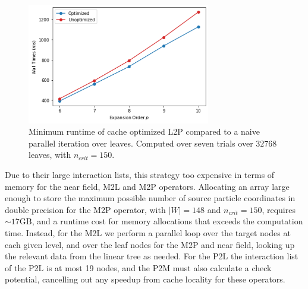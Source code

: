 \documentclass{IEEEcsmag}
\begin{document}
\begin{figure}
	\centerline{\includegraphics[width=8cm]{figures/speedup.png}}
    \caption{Minimum runtime of cache optimized L2P compared to a naive parallel iteration over leaves. Computed over seven trials over $32768$ leaves, with $n_{crit}=150$.}
	\label{fig:l2p_cache}
\end{figure}




Due to their large interaction lists, this strategy too expensive in terms of memory for the near field, M2L and M2P operators. Allocating an array large enough to store the maximum possible number of source particle coordinates in double precision for the M2P operator, with $|W|=148$ and $n_{crit}=150$, requires $\sim 17$GB, and a runtime cost for memory allocations that exceeds the computation time. Instead, for the M2L we perform a parallel loop over the target nodes at each given level, and over the leaf nodes for the M2P and near field, looking up the relevant data from the linear tree as needed. For the P2L the interaction list of the P2L is at most 19 nodes, and the P2M must also calculate a check potential, cancelling out any speedup from cache locality for these operators.
\end{document}
